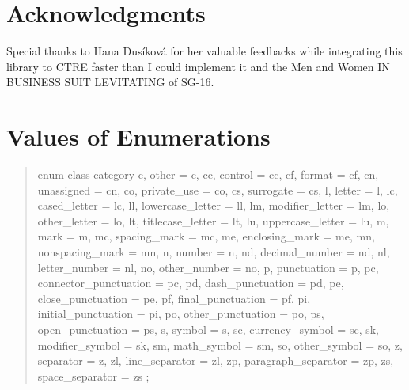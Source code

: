 \documentclass{wg21}
\begin{document}
\section{Acknowledgments}

Special thanks to Hana Dusíková for her valuable feedbacks while integrating this library to CTRE faster than I could implement it and the Men and Women IN BUSINESS SUIT LEVITATING of SG-16.



\section{Values of Enumerations}

\begin{quote}
\begin{itemdecl}
enum class category {
    c,
    other = c,
    cc,
    control = cc,
    cf,
    format = cf,
    cn,
    unassigned = cn,
    co,
    private_use = co,
    cs,
    surrogate = cs,
    l,
    letter = l,
    lc,
    cased_letter = lc,
    ll,
    lowercase_letter = ll,
    lm,
    modifier_letter = lm,
    lo,
    other_letter = lo,
    lt,
    titlecase_letter = lt,
    lu,
    uppercase_letter = lu,
    m,
    mark = m,
    mc,
    spacing_mark = mc,
    me,
    enclosing_mark = me,
    mn,
    nonspacing_mark = mn,
    n,
    number = n,
    nd,
    decimal_number = nd,
    nl,
    letter_number = nl,
    no,
    other_number = no,
    p,
    punctuation = p,
    pc,
    connector_punctuation = pc,
    pd,
    dash_punctuation = pd,
    pe,
    close_punctuation = pe,
    pf,
    final_punctuation = pf,
    pi,
    initial_punctuation = pi,
    po,
    other_punctuation = po,
    ps,
    open_punctuation = ps,
    s,
    symbol = s,
    sc,
    currency_symbol = sc,
    sk,
    modifier_symbol = sk,
    sm,
    math_symbol = sm,
    so,
    other_symbol = so,
    z,
    separator = z,
    zl,
    line_separator = zl,
    zp,
    paragraph_separator = zp,
    zs,
    space_separator = zs
};
\end{itemdecl}


\end{quote}
\end{document}
